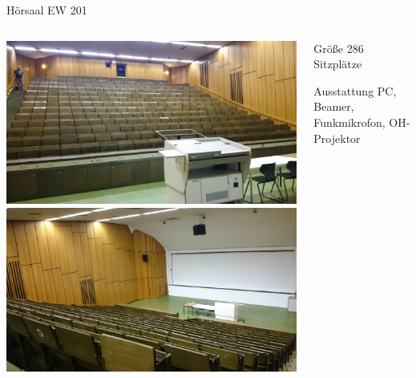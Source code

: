 \documentclass[compress,]{beamer}
\begin{document}
\begin{frame}{Hörsaal EW 201}
  \begin{columns}[onlytextwidth]
    \begin{column}{0.5\textwidth}
      \includegraphics[width=\textwidth]{images/DSC_0712.JPG}\\
      \includegraphics[width=\textwidth]{images/DSC_0711.JPG}
    \end{column}
    \begin{column}{0.4\textwidth}
      \begin{block}{Größe}
        286 Sitzplätze
      \end{block}
      \vspace{1cm}
      \begin{block}{Ausstattung}
        PC, Beamer, Funkmikrofon, OH-Projektor
      \end{block}
    \end{column}
  \end{columns}
\end{frame}
\end{document}
